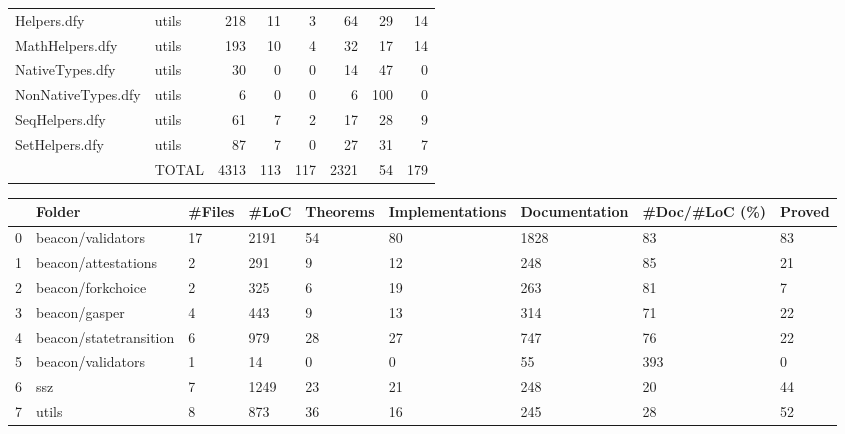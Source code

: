 \documentclass[a4paper, 12pt]{article}
\begin{document}
\begin{tabular}{llrrrrrr}
             Helpers.dfy &                   utils &   218 &        11 &                3 &             64 &             29 &      14 \\
         MathHelpers.dfy &                   utils &   193 &        10 &                4 &             32 &             17 &      14 \\
         NativeTypes.dfy &                   utils &    30 &         0 &                0 &             14 &             47 &       0 \\
      NonNativeTypes.dfy &                   utils &     6 &         0 &                0 &              6 &            100 &       0 \\
          SeqHelpers.dfy &                   utils &    61 &         7 &                2 &             17 &             28 &       9 \\
          SetHelpers.dfy &                   utils &    87 &         7 &                0 &             27 &             31 &       7 \\
                         &                   TOTAL &  4313 &       113 &              117 &           2321 &             54 &     179 \\
\bottomrule
\end{tabular}

\vspace{2em}
\begin{tabular}{lllllllll}
\toprule
{} &                  Folder & \#Files &  \#LoC & Theorems & Implementations & Documentation & \#Doc/\#LoC (\%) & Proved \\
\midrule
0 &       beacon/validators &     17 &  2191 &       54 &              80 &          1828 &            83 &     83 \\
1 &     beacon/attestations &      2 &   291 &        9 &              12 &           248 &            85 &     21 \\
2 &       beacon/forkchoice &      2 &   325 &        6 &              19 &           263 &            81 &      7 \\
3 &           beacon/gasper &      4 &   443 &        9 &              13 &           314 &            71 &     22 \\
4 &  beacon/statetransition &      6 &   979 &       28 &              27 &           747 &            76 &     22 \\
5 &       beacon/validators &      1 &    14 &        0 &               0 &            55 &           393 &      0 \\
6 &                     ssz &      7 &  1249 &       23 &              21 &           248 &            20 &     44 \\
7 &                   utils &      8 &   873 &       36 &              16 &           245 &            28 &     52 \\
\bottomrule
\end{tabular}
\end{document}
